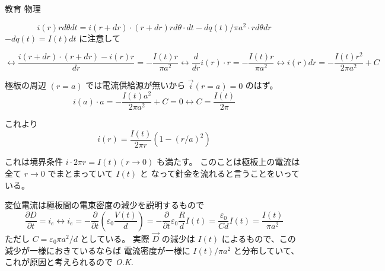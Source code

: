 \documentclass[fleqn]{jbook}
\begin{document}
\begin{answer}{教育 物理}{}
\begin{subanswers}
\begin{subsubanswers}
\[ i(r)r d\theta dt = i(r+dr) \cdot (r+dr)rd\theta \cdot dt - dq(t)/\pi a^{2} \cdot rd\theta dr \]
$ -dq(t) = I(t)dt $ に注意して

\[
\leftrightarrow \frac{i(r+dr)\cdot (r+dr) - i(r)r}{dr} = -\frac{I(t)r}{\pi a^{2}} 
\leftrightarrow \frac{d}{dr}{i(r)\cdot r} = -\frac{I(t)r}{\pi a^2} 
\leftrightarrow i(r)dr = -\frac{I(t)r^{2}}{2\pi a^{2}} +C 
\]

極板の周辺 $(r=a)$ では電流供給源が無いから $\vec{i}(r=a)=0$ のはず。
\[
i(a)\cdot a = -\frac{I(t)a^2}{2\pi a^2} + C = 0 
\leftrightarrow C = \frac{I(t)}{2\pi} 
\]

これより
\[ i(r) = \frac{I(t)}{2\pi r} \left( 1 - \left(r/a\right)^2  \right) \]

これは境界条件 $i\cdot 2\pi r= I(t) (r \rightarrow 0)$ も満たす。
このことは極板上の電流は全て $r\rightarrow 0 $ でまとまっていて $I(t) $ と
なって針金を流れると言うことをいっている。

変位電流は極板間の電束密度の減少を説明するもので
\[
\frac{\partial D}{\partial t} = i_e 
\leftrightarrow i_e = -\frac{\partial}{\partial t} \left(
\varepsilon _0\frac{V(t)}{d} \right) 
= -\frac{\partial}{\partial t}\varepsilon _{0} \frac{R}{d}I(t) 
= \frac{\varepsilon _{0}}{Cd} I(t) 
= \frac{I(t)}{\pi a^2} 
\]
ただし $C=\varepsilon _0 \pi a^2 / d$ としている。
実際 $\vec{D}$ の減少は $I(t)$ によるもので、この減少が一様におきているならば
電流密度が一様に $I(t)/\pi a^{2}$ と分布していて、これが原因と考えられるので
{\it O.K.}

\SubSubAnswer


\end{subsubanswers}
\end{subanswers}
\end{answer}
\end{document}
